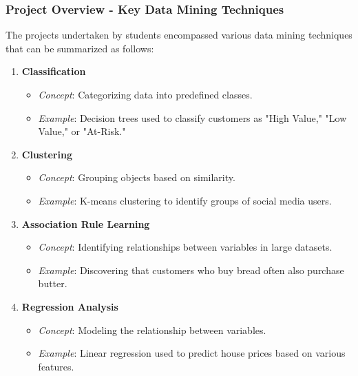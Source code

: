 \documentclass[aspectratio=169]{beamer}
\begin{document}
\begin{frame}[fragile]
    \frametitle{Project Overview - Key Data Mining Techniques}
    The projects undertaken by students encompassed various data mining techniques that can be summarized as follows:
    
    \begin{enumerate}
        \item \textbf{Classification}
            \begin{itemize}
                \item \emph{Concept}: Categorizing data into predefined classes. 
                \item \emph{Example}: Decision trees used to classify customers as "High Value," "Low Value," or "At-Risk."
            \end{itemize}

        \item \textbf{Clustering}
            \begin{itemize}
                \item \emph{Concept}: Grouping objects based on similarity.
                \item \emph{Example}: K-means clustering to identify groups of social media users.
            \end{itemize}

        \item \textbf{Association Rule Learning}
            \begin{itemize}
                \item \emph{Concept}: Identifying relationships between variables in large datasets. 
                \item \emph{Example}: Discovering that customers who buy bread often also purchase butter.
            \end{itemize}

        \item \textbf{Regression Analysis}
            \begin{itemize}
                \item \emph{Concept}: Modeling the relationship between variables.
                \item \emph{Example}: Linear regression used to predict house prices based on various features.
            \end{itemize}
    \end{enumerate}
\end{frame}
\end{document}
